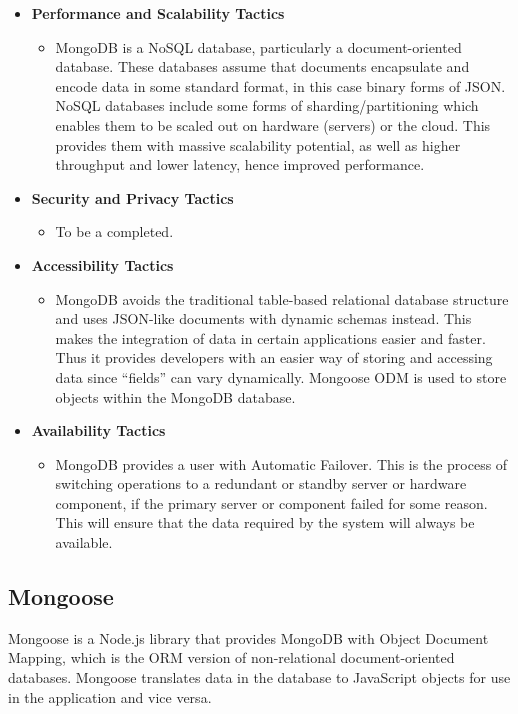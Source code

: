 \documentclass[a4paper,12pt]{article}
\begin{document}
	\begin{itemize}
		\item\textbf{Performance and Scalability Tactics}
		\begin{itemize}
			\item MongoDB is a NoSQL database, particularly a document-oriented database. These databases assume that documents encapsulate and encode data in some standard format, in this case binary forms of JSON. NoSQL databases include some forms of sharding/partitioning which enables them to be scaled out on hardware (servers) or the cloud. This provides them with massive scalability potential, as well as higher throughput and lower latency, hence improved performance. 
		\end{itemize}
		
		\item\textbf{Security and Privacy Tactics}
		\begin{itemize}
			\item To be a completed.
		\end{itemize}
		
		\item\textbf{Accessibility Tactics}
		\begin{itemize}
			\item MongoDB avoids the traditional table-based relational database structure and uses JSON-like documents with dynamic schemas instead. This makes the integration of data in certain applications easier and faster. Thus it provides developers with an easier way of storing and accessing data since “fields” can vary dynamically. Mongoose ODM is used to store objects within the MongoDB database. 
		\end{itemize}
		
		\item\textbf{Availability Tactics}
		\begin{itemize}
			\item MongoDB provides a user with Automatic Failover. This is the process of switching operations to a redundant or standby server or hardware component, if the primary server or component failed for some reason. This will ensure that the data required by the system will always be available.
		\end{itemize}
	\end{itemize}
	
	\newpage
	\subsection{Mongoose}
	Mongoose is a Node.js library that provides MongoDB with Object Document Mapping, which is the ORM version of non-relational document-oriented databases. Mongoose translates data in the database to JavaScript objects for use in the application and vice versa.
	
\end{document}
